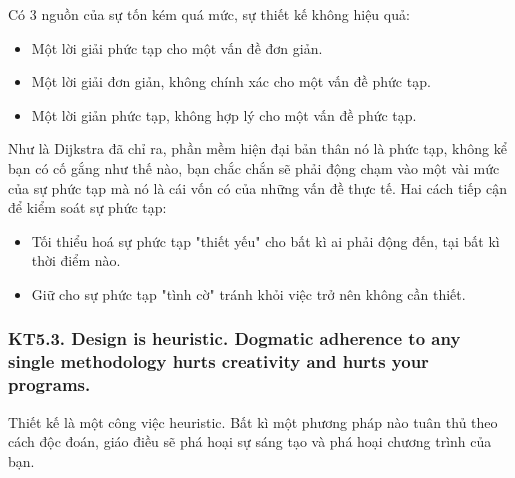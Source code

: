 \documentclass[12pt]{report}
\begin{document}
Có 3 nguồn của sự tốn kém quá mức, sự thiết kế không hiệu quả:
\begin{itemize}
	\item Một lời giải phức tạp cho một vấn đề đơn giản. 
	\item Một lời giải đơn giản, không chính xác cho một vấn đề phức tạp. 
	\item Một lời giản phức tạp, không hợp lý cho một vấn đề phức tạp. 
\end{itemize}
Như là Dijkstra đã chỉ ra, phần mềm hiện đại bản thân nó là phức tạp, không kể bạn có cố gắng như thế nào, bạn chắc chắn sẽ phải động chạm vào một vài mức của sự phức tạp mà nó là cái vốn có của những vấn đề thực tế. 
Hai cách tiếp cận để kiểm soát sự phức tạp:
\begin{itemize}
	\item Tối thiểu hoá sự phức tạp "thiết yếu" cho bất kì ai phải động đến, tại bất kì thời điểm nào. 
	\item Giữ cho sự phức tạp "tình cờ" tránh khỏi việc trở nên không cần thiết. 
\end{itemize}

\subsubsection{KT5.3. Design is heuristic. Dogmatic adherence to any single methodology hurts creativity and hurts your programs.}
Thiết kế là một công việc heuristic. Bất kì một phương pháp nào tuân thủ theo cách độc đoán, giáo điều sẽ phá hoại sự sáng tạo và phá hoại chương trình của bạn. 
\vspace*{3mm}
\end{document}
